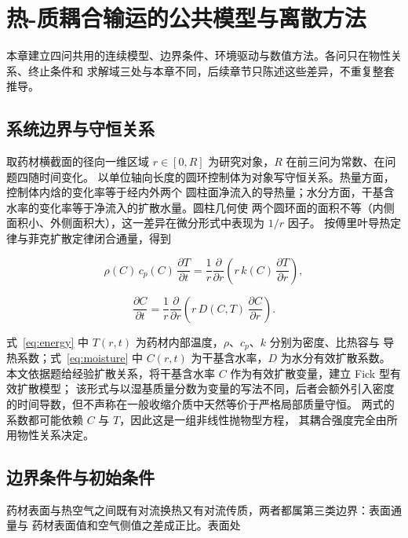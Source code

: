 \section{热-质耦合输运的公共模型与离散方法}

本章建立四问共用的连续模型、边界条件、环境驱动与数值方法。各问只在物性关系、终止条件和
求解域三处与本章不同，后续章节只陈述这些差异，不重复整套推导。

\subsection{系统边界与守恒关系}

取药材横截面的径向一维区域 $r\in[0,R]$ 为研究对象，$R$ 在前三问为常数、在问题四随时间变化。
以单位轴向长度的圆环控制体为对象写守恒关系。热量方面，控制体内焓的变化率等于经内外两个
圆柱面净流入的导热量；水分方面，干基含水率的变化率等于净流入的扩散水量。圆柱几何使
两个圆环面的面积不等（内侧面积小、外侧面积大），这一差异在微分形式中表现为 $1/r$ 因子。
按傅里叶导热定律与菲克扩散定律闭合通量，得到

\begin{equation}\label{eq:energy}
\rho(C)\,c_p(C)\,\frac{\partial T}{\partial t}
=\frac{1}{r}\frac{\partial}{\partial r}\!\left(r\,k(C)\,\frac{\partial T}{\partial r}\right),
\end{equation}

\begin{equation}\label{eq:moisture}
\frac{\partial C}{\partial t}
=\frac{1}{r}\frac{\partial}{\partial r}\!\left(r\,D(C,T)\,\frac{\partial C}{\partial r}\right).
\end{equation}

式~\eqref{eq:energy} 中 $T(r,t)$ 为药材内部温度，$\rho$、$c_p$、$k$ 分别为密度、比热容与
导热系数；式~\eqref{eq:moisture} 中 $C(r,t)$ 为干基含水率，$D$ 为水分有效扩散系数。
本文依据题给经验扩散关系，将干基含水率 $C$ 作为有效扩散变量，建立 Fick 型有效扩散模型；
该形式与以湿基质量分数为变量的写法不同，后者会额外引入密度的时间导数，但不声称在一般收缩介质中天然等价于严格局部质量守恒。
两式的系数都可能依赖 $C$ 与 $T$，因此这是一组非线性抛物型方程，
其耦合强度完全由所用物性关系决定。

\subsection{边界条件与初始条件}

药材表面与热空气之间既有对流换热又有对流传质，两者都属第三类边界：表面通量与
药材表面值和空气侧值之差成正比。表面处

